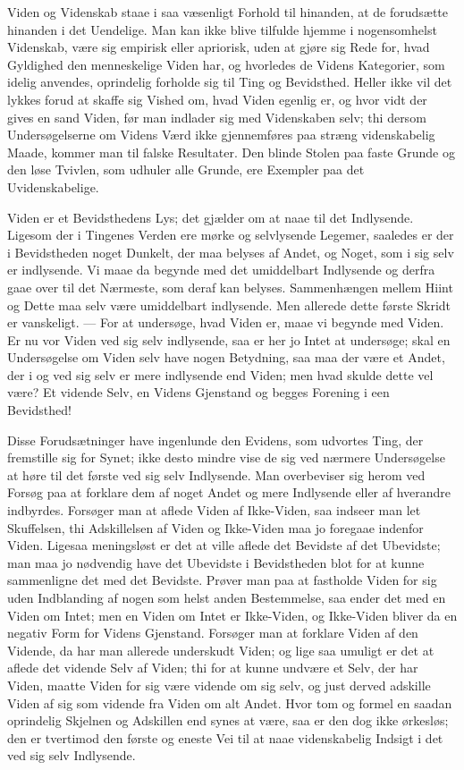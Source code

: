 \documentclass[12pt]{book}
\newcommand{\apage}[1]{\marginnote{\footnotesize\textit{[#1]}}}
\begin{document}
Viden og Videnskab staae i saa væsenligt Forhold til hinanden, at de
forudsætte hinanden i det Uendelige. Man kan ikke blive tilfulde hjemme i
nogensomhelst Videnskab, være sig empirisk eller apriorisk, uden at gjøre
sig Rede for, hvad Gyldighed den menneskelige Viden har, og hvorledes de
Videns Kategorier, som idelig anvendes, oprindelig forholde sig til Ting
og Bevidsthed. Heller ikke vil det lykkes forud at skaffe sig Vished om,
hvad Viden egenlig er, og hvor vidt der gives en sand Viden, før man
indlader sig med Videnskaben selv; thi dersom Undersøgelserne om Videns
Værd ikke gjennemføres paa stræng videnskabelig Maade, kommer man til
falske Resultater. Den blinde Stolen paa faste Grunde og den løse
Tvivlen, som udhuler alle Grunde, ere Exempler paa det Uvidenskabelige.

Viden er et Bevidsthedens Lys; det gjælder om at naae til det Indlysende.
Ligesom der i Tingenes Verden ere mørke og selvlysende Legemer, saaledes
er der i Bevidstheden noget Dunkelt, der maa belyses af Andet, og Noget,
som i sig selv er indlysende. Vi maae da begynde med det umiddelbart
Indlysende og derfra gaae over til det Nærmeste, som deraf kan belyses.
Sammenhængen mellem Hiint og Dette maa selv være umiddelbart indlysende.
Men allerede dette første Skridt er vanskeligt. --- For at undersøge, hvad
Viden er, maae vi begynde med Viden. Er nu vor Viden ved sig selv
indlysende, saa er her jo Intet at \apage{7} undersøge; skal en Undersøgelse om
Viden selv have nogen Betydning, saa maa der være et Andet, der i og ved
sig selv er mere indlysende end Viden; men hvad skulde dette vel være? Et
vidende Selv, en Videns Gjenstand og begges Forening i een Bevidsthed!

Disse Forudsætninger have ingenlunde den Evidens, som udvortes Ting, der
fremstille sig for Synet; ikke desto mindre vise de sig ved nærmere
Undersøgelse at høre til det første ved sig selv Indlysende. Man
overbeviser sig herom ved Forsøg paa at forklare dem af noget Andet og
mere Indlysende eller af hverandre indbyrdes. Forsøger man at aflede
Viden af Ikke-Viden, saa indseer man let Skuffelsen, thi Adskillelsen af
Viden og Ikke-Viden maa jo foregaae indenfor Viden. Ligesaa meningsløst
er det at ville aflede det Bevidste af det Ubevidste; man maa jo nødvendig
have det Ubevidste i Bevidstheden blot for at kunne sammenligne det med
det Bevidste. Prøver man paa at fastholde Viden for sig uden Indblanding
af nogen som helst anden Bestemmelse, saa ender det med en Viden om
Intet; men en Viden om Intet er Ikke-Viden, og Ikke-Viden bliver da en
negativ Form for Videns Gjenstand. Forsøger man at forklare Viden af den
Vidende, da har man allerede underskudt Viden; og lige saa umuligt er det
at aflede det vidende Selv af Viden; thi for at kunne undvære et Selv, der
har Viden, maatte Viden for sig være vidende om sig selv, og just derved
adskille Viden af sig som vidende fra Viden om alt Andet. Hvor tom og
formel en saadan oprindelig Skjelnen og Adskillen end synes at være, saa
er \apage{8} den dog ikke ørkesløs; den er tvertimod den første og eneste Vei til
at naae videnskabelig Indsigt i det ved sig selv Indlysende.
\end{document}
